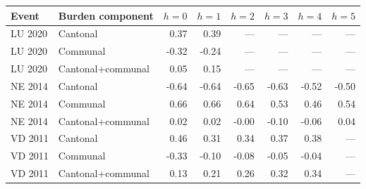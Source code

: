 \begin{tabular}{llrrrrrr}
\toprule
Event & Burden component & $h=0$ & $h=1$ & $h=2$ & $h=3$ & $h=4$ & $h=5$ \\
\midrule
LU 2020 & Cantonal & 0.37 & 0.39 & --- & --- & --- & --- \\
LU 2020 & Communal & -0.32 & -0.24 & --- & --- & --- & --- \\
LU 2020 & Cantonal+communal & 0.05 & 0.15 & --- & --- & --- & --- \\
NE 2014 & Cantonal & -0.64 & -0.64 & -0.65 & -0.63 & -0.52 & -0.50 \\
NE 2014 & Communal & 0.66 & 0.66 & 0.64 & 0.53 & 0.46 & 0.54 \\
NE 2014 & Cantonal+communal & 0.02 & 0.02 & -0.00 & -0.10 & -0.06 & 0.04 \\
VD 2011 & Cantonal & 0.46 & 0.31 & 0.34 & 0.37 & 0.38 & --- \\
VD 2011 & Communal & -0.33 & -0.10 & -0.08 & -0.05 & -0.04 & --- \\
VD 2011 & Cantonal+communal & 0.13 & 0.21 & 0.26 & 0.32 & 0.34 & --- \\
\bottomrule
\end{tabular}